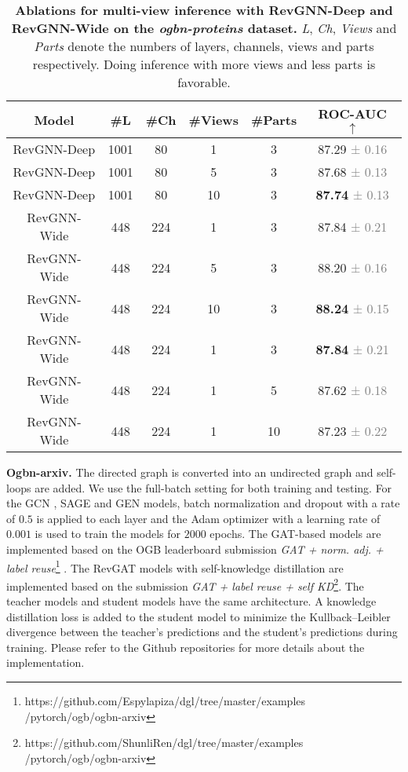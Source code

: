 \documentclass{article}
\newcommand{\mysection}[1]{\vspace{0pt}\noindent\textbf{#1.}}
\begin{document}
\begin{table}[t]
\centering
\setlength{\tabcolsep}{2pt}
\caption{\textbf{Ablations for multi-view inference with RevGNN-Deep and RevGNN-Wide on the \emph{ogbn-proteins} dataset.} \emph{L}, \emph{Ch}, \emph{Views} and \emph{Parts} denote the numbers of layers, channels, views and parts respectively. Doing inference with more views and less parts is favorable.}
\vspace{2pt}
\begin{tabular}{cccccc}
\toprule
  \label{table:multi_view}
  \centering
Model & \#L & \#Ch & \#Views & \#Parts & ROC-AUC $\uparrow$ \\
\midrule
RevGNN-Deep & 1001 & 80 & 1 & 3 &
87.29 \textcolor{gray}{\small{± 0.16}}\\
RevGNN-Deep & 1001 & 80 & 5 & 3 &
87.68 \textcolor{gray}{\small{± 0.13}}\\
RevGNN-Deep & 1001 & 80 & 10 & 3 &
\textbf{87.74} \textcolor{gray}{\small{± 0.13}}\\
\midrule
RevGNN-Wide & 448 & 224 & 1 & 3
& 87.84 \textcolor{gray}{\small{± 0.21}}\\
RevGNN-Wide & 448 & 224 & 5 & 3
& 88.20 \textcolor{gray}{\small{± 0.16}}\\
RevGNN-Wide & 448 & 224 & 10 & 3
& \textbf{88.24} \textcolor{gray}{\small{± 0.15}}\\
\midrule
RevGNN-Wide & 448 & 224 & 1 & 3
& \textbf{87.84} \textcolor{gray}{\small{± 0.21}}\\
RevGNN-Wide & 448 & 224 & 1 & 5
& 87.62 \textcolor{gray}{\small{± 0.18}}\\
RevGNN-Wide & 448 & 224 & 1 & 10
& 87.23 \textcolor{gray}{\small{± 0.22}}\\
\bottomrule
\end{tabular}
\end{table}

\mysection{Ogbn-arxiv}
The directed graph is converted into an undirected graph and self-loops are added. We use the full-batch setting for both training and testing. For the GCN \citep{kipf2017semi}, SAGE \citep{hamilton2017inductive} and GEN \citep{li2020deepergcn} models, batch normalization and dropout with a rate of $0.5$ is applied to each layer and the Adam optimizer with a learning rate of $0.001$ is used to train the models for $2000$ epochs. The GAT-based \citep{veli2018gat} models are implemented based on the OGB leaderboard submission \emph{GAT + norm. adj. + label reuse}\footnote{\small{https://github.com/Espylapiza/dgl/tree/master/examples \\ /pytorch/ogb/ogbn-arxiv}} \citep{wang2021bag}. The RevGAT models with self-knowledge distillation are implemented based on the submission \emph{GAT + label reuse + self KD}\footnote{ https://github.com/ShunliRen/dgl/tree/master/examples \\
/pytorch/ogb/ogbn-arxiv}. The teacher models and student models have the same architecture. A knowledge distillation loss is added to the student model to minimize the Kullback–Leibler divergence between the teacher's predictions and the student's predictions during training. Please refer to the Github repositories for more details about the implementation.
\end{document}
